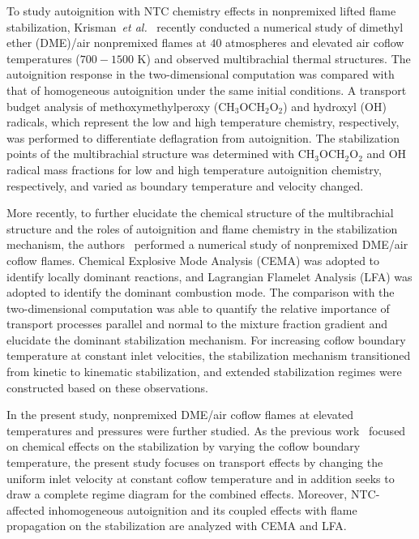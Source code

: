 \documentclass[review,3p,times]{elsarticle}
\begin{document}
To study autoignition with NTC chemistry effects in nonpremixed lifted flame stabilization, Krisman~\emph{et al.}~\cite{krisman14} recently conducted a numerical study of dimethyl ether (DME)/air nonpremixed flames at $40$ atmospheres and elevated air coflow temperatures ($700-1500$ K) and observed multibrachial thermal structures.  The autoignition response in the two-dimensional computation was compared with that of homogeneous autoignition under the same initial conditions.  A transport budget analysis of methoxymethylperoxy (CH$_3$OCH$_2$O$_2$) and hydroxyl (OH) radicals, which represent the low and high temperature chemistry, respectively, was performed to differentiate deflagration from autoignition.  The stabilization points of the multibrachial structure was determined with CH$_3$OCH$_2$O$_2$ and OH radical mass fractions for low and high temperature autoignition chemistry, respectively, and varied as boundary temperature and velocity changed.

More recently, to further elucidate the chemical structure of the multibrachial structure and the roles of autoignition and flame chemistry in the stabilization mechanism, the authors~\cite{deng15} performed a numerical study of nonpremixed DME/air coflow flames.  Chemical Explosive Mode Analysis (CEMA) was adopted to identify locally dominant reactions, and Lagrangian Flamelet Analysis (LFA) was adopted to identify the dominant combustion mode.  The comparison with the two-dimensional computation was able to quantify the relative importance of transport processes parallel and normal to the mixture fraction gradient and elucidate the dominant stabilization mechanism.  For increasing coflow boundary temperature at constant inlet velocities, the stabilization mechanism transitioned from kinetic to kinematic stabilization, and extended stabilization regimes were constructed based on these observations.

In the present study, nonpremixed DME/air coflow flames at elevated temperatures and pressures were further studied.  As the previous work~\cite{deng15} focused on chemical effects on the stabilization by varying the coflow boundary temperature, the present study focuses on transport effects by changing the uniform inlet velocity at constant coflow temperature and in addition seeks to draw a complete regime diagram for the combined effects.  Moreover, NTC-affected inhomogeneous autoignition and its coupled effects with flame propagation on the stabilization are analyzed with CEMA and LFA.  
\end{document}
